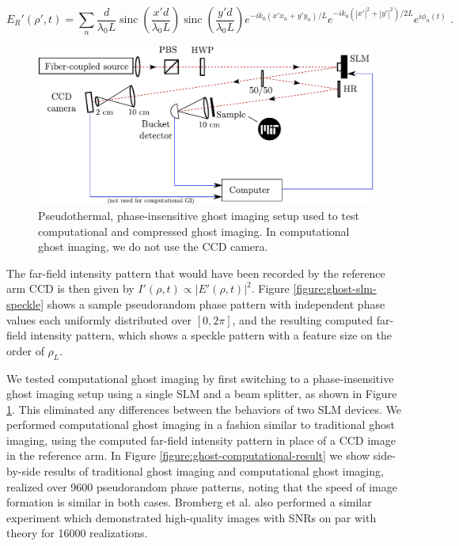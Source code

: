 \begin{equation}
E_R'(\rho', t) = \sum_n \frac{d}{\lambda_0 L} \operatorname{sinc}\left(\frac{x'd}{\lambda_0 L}\right) \operatorname{sinc}\left(\frac{y'd}{\lambda_0 L}\right) e^{-i k_0(x'x_n + y'y_n)/L} e^{-ik_0(|x'|^2 + |y'|^2)/2L} e^{i\phi_n(t)}\,\,.
\end{equation}


\begin{figure}[t]
\begin{center}
\includegraphics[width=13cm]{figure-ghost-computational-setup.pdf}
\caption{Pseudothermal, phase-insensitive ghost imaging setup used to test computational and compressed ghost imaging. In computational ghost imaging, we do not use the CCD camera.}
\label{figure:ghost-computational-setup}
\end{center}
\end{figure}


The far-field intensity pattern that would have been recorded by the reference arm CCD is then given by $I'(\rho, t) \propto |E'(\rho, t)|^2$. Figure \ref{figure:ghost-slm-speckle} shows a sample pseudorandom phase pattern with independent phase values each uniformly distributed over $[0, 2\pi]$, and the resulting computed far-field intensity pattern, which shows a speckle pattern with a feature size on the order of $\rho_L$.

We tested computational ghost imaging by first switching to a phase-insensitive ghost imaging setup using a single SLM and a beam splitter, as shown in Figure \ref{figure:ghost-computational-setup}. This eliminated any differences between the behaviors of two SLM devices. We performed computational ghost imaging in a fashion similar to traditional ghost imaging, using the computed far-field intensity pattern in place of a CCD image in the reference arm. In Figure \ref{figure:ghost-computational-result} we show side-by-side results of traditional ghost imaging and computational ghost imaging, realized over 9600 pseudorandom phase patterns, noting that the speed of image formation is similar in both cases. Bromberg et al. \cite{bromberg-ghost} also performed a similar experiment which demonstrated high-quality images with SNRs on par with theory for 16000 realizations.


